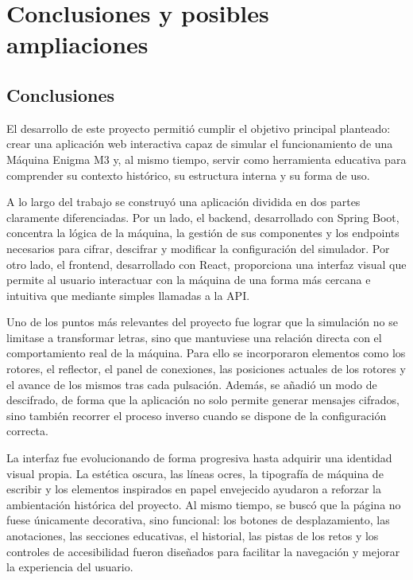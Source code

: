 \chapter{Conclusiones y posibles ampliaciones}

\section{Conclusiones}

El desarrollo de este proyecto permitió cumplir el objetivo principal planteado: crear una aplicación web interactiva capaz de simular el funcionamiento de una Máquina Enigma M3 y, al mismo tiempo, servir como herramienta educativa para comprender su contexto histórico, su estructura interna y su forma de uso.

A lo largo del trabajo se construyó una aplicación dividida en dos partes claramente diferenciadas. Por un lado, el backend, desarrollado con Spring Boot, concentra la lógica de la máquina, la gestión de sus componentes y los endpoints necesarios para cifrar, descifrar y modificar la configuración del simulador. Por otro lado, el frontend, desarrollado con React, proporciona una interfaz visual que permite al usuario interactuar con la máquina de una forma más cercana e intuitiva que mediante simples llamadas a la API.

Uno de los puntos más relevantes del proyecto fue lograr que la simulación no se limitase a transformar letras, sino que mantuviese una relación directa con el comportamiento real de la máquina. Para ello se incorporaron elementos como los rotores, el reflector, el panel de conexiones, las posiciones actuales de los rotores y el avance de los mismos tras cada pulsación. Además, se añadió un modo de descifrado, de forma que la aplicación no solo permite generar mensajes cifrados, sino también recorrer el proceso inverso cuando se dispone de la configuración correcta.

La interfaz fue evolucionando de forma progresiva hasta adquirir una identidad visual propia. La estética oscura, las líneas ocres, la tipografía de máquina de escribir y los elementos inspirados en papel envejecido ayudaron a reforzar la ambientación histórica del proyecto. Al mismo tiempo, se buscó que la página no fuese únicamente decorativa, sino funcional: los botones de desplazamiento, las anotaciones, las secciones educativas, el historial, las pistas de los retos y los controles de accesibilidad fueron diseñados para facilitar la navegación y mejorar la experiencia del usuario.

